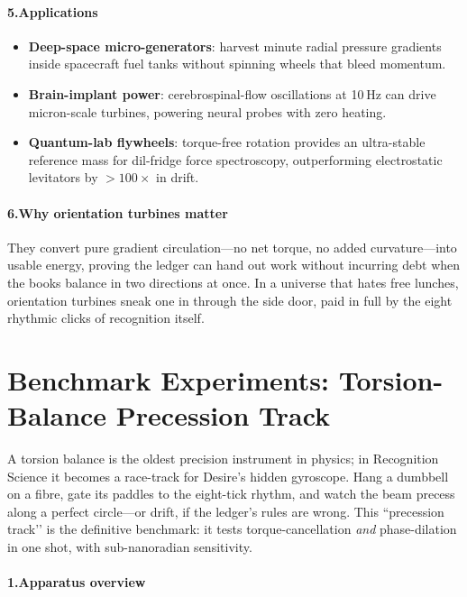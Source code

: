 \documentclass[11pt,oneside]{book}
\begin{document}
\paragraph*{5.\;Applications}

\begin{itemize}
\item \textbf{Deep-space micro-generators}: harvest minute radial
      pressure gradients inside spacecraft fuel tanks without spinning
      wheels that bleed momentum.
\item \textbf{Brain-implant power}: cerebrospinal-flow oscillations at
      10 Hz can drive micron-scale turbines, powering neural probes with
      zero heating.
\item \textbf{Quantum-lab flywheels}: torque-free rotation provides an
      ultra-stable reference mass for dil-fridge force spectroscopy,
      outperforming electrostatic levitators by $>100\times$ in drift.
\end{itemize}

\paragraph*{6.\;Why orientation turbines matter}

They convert pure gradient circulation—no net torque, no added
curvature—into usable energy, proving the ledger can hand out work
without incurring debt when the books balance in two directions at once.
In a universe that hates free lunches, orientation turbines sneak one
in through the side door, paid in full by the eight rhythmic clicks of
recognition itself.

\section{Benchmark Experiments: Torsion-Balance Precession Track}
\label{sec:torsion-precession}

A torsion balance is the oldest precision instrument in physics; in Recognition Science it becomes a race-track for Desire’s hidden gyroscope.  
Hang a dumbbell on a fibre, gate its paddles to the eight-tick rhythm, and watch the beam precess along a perfect circle—or drift, if the ledger’s rules are wrong.  
This “precession track’’ is the definitive benchmark: it tests torque-cancellation \emph{and} phase-dilation in one shot, with sub-nanoradian sensitivity.

\paragraph*{1.\;Apparatus overview}
\end{document}
